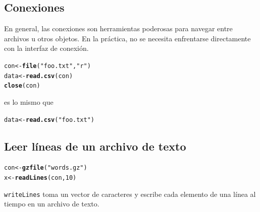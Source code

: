\documentclass{article}\usepackage[]{graphicx}\usepackage[]{color}
\makeatletter
\newcommand{\hlnum}[1]{\textcolor[rgb]{0.686,0.059,0.569}{#1}}%
\newcommand{\hlstr}[1]{\textcolor[rgb]{0.192,0.494,0.8}{#1}}%
\newcommand{\hlstd}[1]{\textcolor[rgb]{0.345,0.345,0.345}{#1}}%
\newcommand{\hlkwb}[1]{\textcolor[rgb]{0.69,0.353,0.396}{#1}}%
\newcommand{\hlkwd}[1]{\textcolor[rgb]{0.737,0.353,0.396}{\textbf{#1}}}%
\newenvironment{kframe}{%
 \def\at@end@of@kframe{}%
 \ifinner\ifhmode%
  \def\at@end@of@kframe{\end{minipage}}%
  \begin{minipage}{\columnwidth}%
 \fi\fi%
 \def\FrameCommand##1{\hskip\@totalleftmargin \hskip-\fboxsep
 \colorbox{shadecolor}{##1}\hskip-\fboxsep
     \hskip-\linewidth \hskip-\@totalleftmargin \hskip\columnwidth}%
 \MakeFramed {\advance\hsize-\width
   \@totalleftmargin\z@ \linewidth\hsize
   \@setminipage}}%
 {\par\unskip\endMakeFramed%
 \at@end@of@kframe}
\newenvironment{knitrout}{}{} %
\makeatother
\begin{document}
  \subsection{Conexiones}
  En general, las conexiones son herramientas poderosas para navegar entre archivos u otros objetos. En la práctica, no se necesita enfrentarse directamente con la interfaz de conexión. 
\begin{knitrout}
\color{fgcolor}\begin{kframe}
\begin{alltt}
  \hlstd{con} \hlkwb{<-} \hlkwd{file}\hlstd{(}\hlstr{"foo.txt"}\hlstd{,} \hlstr{"r"}\hlstd{)}
  \hlstd{data} \hlkwb{<-} \hlkwd{read.csv}\hlstd{(con)}
  \hlkwd{close}\hlstd{(con)}
\end{alltt}
\end{kframe}
\end{knitrout}

es lo mismo que
\begin{knitrout}
\color{fgcolor}\begin{kframe}
\begin{alltt}
  \hlstd{data} \hlkwb{<-} \hlkwd{read.csv}\hlstd{(}\hlstr{"foo.txt"}\hlstd{)}
\end{alltt}
\end{kframe}
\end{knitrout}

  \subsection{Leer líneas de un archivo de texto}
\begin{knitrout}
\color{fgcolor}\begin{kframe}
\begin{alltt}
  \hlstd{con} \hlkwb{<-} \hlkwd{gzfile}\hlstd{(}\hlstr{"words.gz"}\hlstd{)}
  \hlstd{x} \hlkwb{<-} \hlkwd{readLines}\hlstd{(con,} \hlnum{10}\hlstd{)}
\end{alltt}
\end{kframe}
\end{knitrout}
  \texttt{writeLines} toma un vector de caracteres y escribe cada elemento de una línea al tiempo en un archivo de texto.
  
\end{document}
